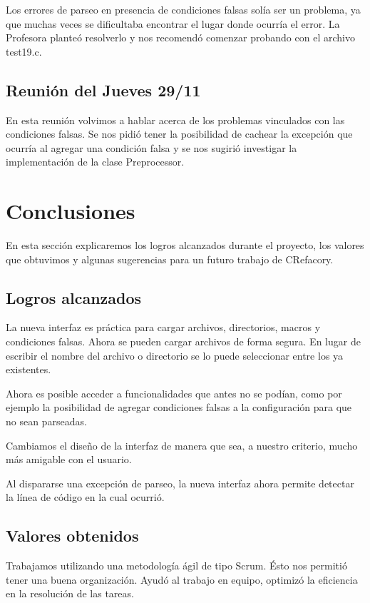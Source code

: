 \documentclass[a4paper,oneside,12pt]{article}
\begin{document}
Los errores de parseo en presencia de condiciones falsas sol\'ia ser un problema, ya que muchas veces se dificultaba encontrar el lugar donde ocurr\'ia el error. La Profesora plante\'o resolverlo y nos recomend\'o comenzar probando con el archivo test19.c.

\subsection{Reuni\'on del Jueves 29/11}
En esta reuni\'on volvimos a hablar acerca de los problemas vinculados con las condiciones falsas. Se nos pidi\'o tener la posibilidad de cachear la excepci\'on que ocurr\'ia al agregar una condici\'on falsa y se nos sugiri\'o investigar la implementaci\'on de la clase Preprocessor.

\section{Conclusiones}
\label{sec:conclusiones}
En esta secci\'on explicaremos los logros alcanzados durante el proyecto, los valores que obtuvimos y algunas sugerencias para un futuro trabajo de CRefacory.

\subsection{Logros alcanzados}
La nueva interfaz es pr\'actica para cargar archivos, directorios, macros y condiciones falsas. Ahora se pueden cargar archivos de forma segura. En lugar de escribir el nombre del archivo o directorio se lo puede seleccionar entre los ya existentes. 

Ahora es posible acceder a funcionalidades que antes no se pod\'ian, como por ejemplo la posibilidad de agregar condiciones falsas a la configuraci\'on para que no sean parseadas.

Cambiamos el diseño de la interfaz de manera que sea, a nuestro criterio, mucho m\'as amigable con el usuario.

Al dispararse una excepci\'on de parseo, la nueva interfaz ahora permite detectar la l\'inea de c\'odigo en la cual ocurri\'o.

\subsection{Valores obtenidos}
Trabajamos utilizando una metodolog\'ia \'agil de tipo Scrum. \'Esto nos permiti\'o tener una buena organizaci\'on. Ayud\'o al trabajo en equipo, optimiz\'o la eficiencia en la resoluci\'on de las tareas.
\end{document}
